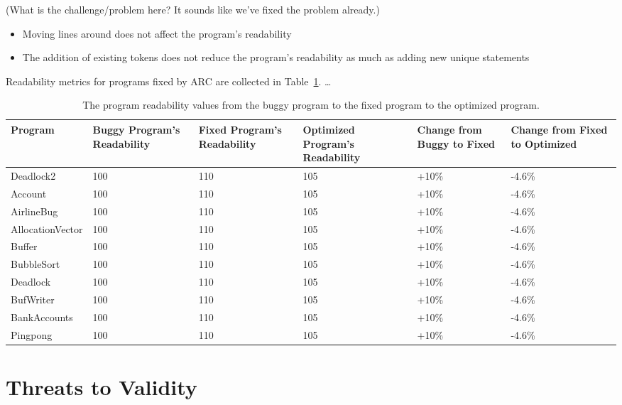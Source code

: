 \documentclass{llncs}
\begin{document}
(What is the challenge/problem here? It sounds like we've fixed the problem
already.)

\begin{itemize}
  \item Moving lines around does not affect the program's readability
  \item The addition of existing tokens does not reduce the program's
readability as much as adding new unique statements
\end{itemize}

Readability metrics for programs fixed by ARC are collected in
Table~\ref{tbl:readability}.
\ldots %

\begin{table}[!t]
\caption{The program readability values from the buggy program to the fixed
program to the optimized program.}
\begin{center}
\begin{tabular}{|l|p{2cm}|p{2cm}|p{2cm}|p{2cm}|p{2cm}|}
\hline
\textbf{Program} &
\textbf{Buggy Program's Readability} &
\textbf{Fixed Program's Readability} &
\textbf{Optimized Program's Readability} &
\textbf{Change from Buggy to Fixed} &
\textbf{Change from Fixed to Optimized}
\\\hline
Deadlock2 & 100 & 110 & 105 & +10\% & -4.6\%
\\\hline
Account & 100 & 110 & 105 & +10\% & -4.6\%
\\\hline
AirlineBug & 100 & 110 & 105 & +10\% & -4.6\%
\\\hline
AllocationVector & 100 & 110 & 105 & +10\% & -4.6\%
\\\hline
Buffer & 100 & 110 & 105 & +10\% & -4.6\%
\\\hline
BubbleSort & 100 & 110 & 105 & +10\% & -4.6\%
\\\hline
Deadlock & 100 & 110 & 105 & +10\% & -4.6\%
\\\hline
BufWriter & 100 & 110 & 105 & +10\% & -4.6\%
\\\hline
BankAccounts & 100 & 110 & 105 & +10\% & -4.6\%
\\\hline
Pingpong & 100 & 110 & 105 & +10\% & -4.6\%
\\\hline
\end{tabular}
\label{tbl:readability}
\end{center}
\end{table}

\section{Threats to Validity}
\label{sec:threats}
\end{document}

